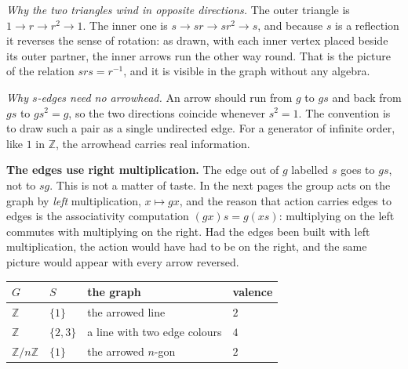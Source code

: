 \documentclass[10pt]{article}
\newcommand{\Z}{\mathbb{Z}}
\newcommand{\inv}{^{-1}}
\begin{document}
{\begin{minipage}[t]{744pt}
{
}\par\vspace{3pt}
\begin{minipage}[t]{370pt}\vspace{0pt}
\begin{why}
\emph{Why the two triangles wind in opposite directions.} The outer triangle is $1\to r\to r^2\to 1$. The inner one is $s\to sr\to sr^2\to s$, and because $s$ is a reflection it reverses the sense of rotation: as drawn, with each inner vertex placed beside its outer partner, the inner arrows run the other way round. That is the picture of the relation $srs=r\inv$, and it is visible in the graph without any algebra.
\end{why}
\begin{why}
\emph{Why $s$-edges need no arrowhead.} An arrow should run from $g$ to $gs$ and back from $gs$ to $gs^2=g$, so the two directions coincide whenever $s^2=1$. The convention is to draw such a pair as a single undirected edge. For a generator of infinite order, like $1$ in $\Z$, the arrowhead carries real information.
\end{why}
\begin{pitfall}
\textbf{The edges use right multiplication.} The edge out of $g$ labelled $s$ goes to $gs$, not to $sg$. This is not a matter of taste. In the next pages the group acts on the graph by \emph{left} multiplication, $x\mapsto gx$, and the reason that action carries edges to edges is the associativity computation $(gx)s=g(xs)$: multiplying on the left commutes with multiplying on the right. Had the edges been built with left multiplication, the action would have had to be on the right, and the same picture would appear with every arrow reversed.
\end{pitfall}
\end{minipage}\hfill
\begin{minipage}[t]{358pt}\vspace{0pt}
\centering
\begin{tabular}{@{}llll@{}}
\toprule
$G$ & $S$ & the graph & valence\\
\midrule
$\Z$ & $\{1\}$ & the arrowed line & $2$\\
$\Z$ & $\{2,3\}$ & a line with two edge colours & $4$\\
$\Z/n\Z$ & $\{1\}$ & the arrowed $n$-gon & $2$\\

\end{tabular}
\end{minipage}
\end{minipage}}
\end{document}
